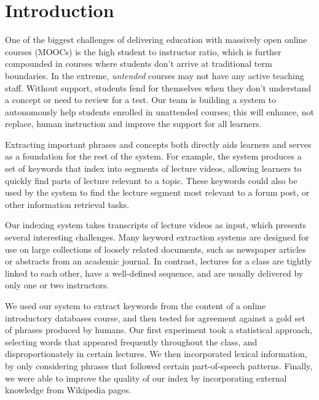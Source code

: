 \section{Introduction}
\label{sec:intro}

One of the biggest challenges of delivering education with massively open online courses (MOOCs) is the high student to instructor ratio, which is further compounded in courses where students don't arrive at traditional term boundaries. In the extreme, \textit{untended} courses may not have any active teaching staff. Without support, students fend for themselves when they don't understand a concept or need to review for a test. Our team is building a system to autonomously help students enrolled in unattended courses; this will enhance, not replace, human instruction and improve the support for all learners.

Extracting important phrases and concepts both directly aids learners and serves as a foundation for the rest of the system. For example, the system produces a set of keywords that index into segments of lecture videos, allowing learners to quickly find parts of lecture relevant to a topic. These keywords could also be used by the system to find the lecture segment most relevant to a forum post, or other information retrieval tasks.

Our indexing system takes transcripts of lecture videos as input, which presents several interesting challenges. Many keyword extraction systems are designed for use on large collections of loosely related documents, such as newspaper articles or abstracts from an academic journal. In contrast, lectures for a class are tightly linked to each other, have a well-defined sequence, and are usually delivered by only one or two instructors.

We used our system to extract keywords from the content of a online introductory databases course, and then tested for agreement against a gold set of phrases produced by humans. Our first experiment took a statistical approach, selecting words that appeared frequently throughout the class, and disproportionately in certain lectures. We then incorporated lexical information, by only considering phrases that followed certain part-of-speech patterns. Finally, we were able to improve the quality of our index by incorporating external knowledge from Wikipedia pages.
